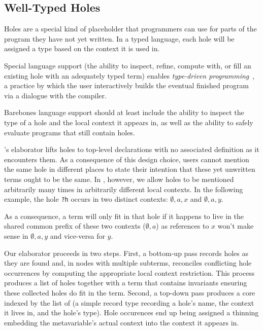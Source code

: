 \subsection{Well-Typed Holes}
\label{sec:design:holes}

Holes are a special kind of placeholder that programmers can use for parts of
the program they have not yet written.
%
In a typed language, each hole will be assigned a type based on the context it
is used in.

Special language support (the ability to inspect, refine, compute with,
or fill an existing hole with an adequately typed term)
enables \emph{type-driven programming}~\cite{DBLP:journals/pacmpl/OmarVCH19},
a practice by which the user interactively builds the eventual finished
program via a dialogue with the compiler.

Barebones language support should at least include the ability to inspect the
type of a hole and the local context it appears in, as well as the ability to
safely evaluate programs that still contain holes.



\Idris{}'s elaborator lifts holes to top-level declarations with no associated
definition as it encounters them.
%
As a consequence of this design choice, users cannot mention the same hole in
different places to state their intention that these yet unwritten terms ought
to be the same.
%
In \Velo{}, however, we allow holes to be mentioned arbitrarily many times in
arbitrarily different local contexts. In the following example, the hole
\texttt{?h} occurs in two distinct contexts: $\emptyset,a,x$ and $\emptyset,a,y$.

\begin{center}
  \holeexamplegraph{}
\end{center}

As a consequence, a term will only fit in that hole if it happens to live in the
shared common prefix of these two contexts ($\emptyset,a$) as references to $x$
won't make sense in $\emptyset,a,y$ and vice-versa for $y$.


Our elaborator proceeds in two steps.
%
First, a bottom-up pass records holes as they are found and, in nodes
with multiple subterms, reconciles conflicting hole occurrences by
computing the appropriate local context restriction.
%
This process produces a list of holes together with a 
term that contains invariants ensuring these collected holes do fit in the term.
%
Second, a top-down pass produces a core  indexed by the list
of  (a simple record type recording a hole's name, the context
it lives in, and the hole's type). Hole occurences end up being assigned a thinning
embedding the metavariable's actual context into the context it appears in.



